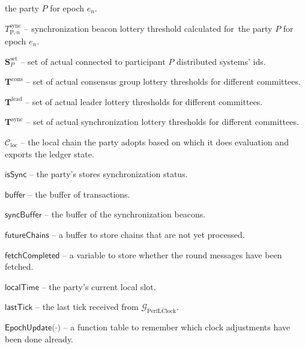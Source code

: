 \begin{legal}
    the party $P$ for epoch $e_n$.
    \item[\ding{113}] $T^{\text{sync}}_{\text{P}, n}$ -- synchronization beacon lottery threshold calculated for\
    the party $P$ for epoch $e_n$.
    \item[\ding{113}] $\mathbf{S}_P^{\text{set}}$ -- set of actual connected to participant $P$ distributed systems' ids.
    \item[\ding{113}] $\mathbf{T}^{\text{cons}}$ -- set of actual consensus group lottery thresholds for different committees.
    \item[\ding{113}] $\mathbf{T}^{\text{lead}}$ -- set of actual leader lottery thresholds for different committees.
    \item[\ding{113}] $\mathbf{T}^{\text{sync}}$ -- set of actual synchronization lottery thresholds for different committees.
    \item[\ding{113}] $\mathcal{C}_{\text{loc}}$ -- the local chain the party adopts based on which it does evaluation and
    exports the ledger state.
    \item[\ding{113}] $\textsf{isSync}$ -- the party's stores synchronization status.
    \item[\ding{113}] $\textsf{buffer}$ -- the buffer of transactions.
    \item[\ding{113}] $\textsf{syncBuffer}$ -- the buffer of the synchronization beacons.
    \item[\ding{113}] $\textsf{futureChains}$ -- a buﬀer to store chains that are not yet processed.
    \item[\ding{113}] $\textsf{fetchCompleted}$ -- a variable to store whether the round messages have been fetched.
    \item[\ding{113}] $\textsf{localTime}$ -- the party's current local slot.
    \item[\ding{113}] $\textsf{lastTick}$ -- the last tick received from $\mathcal{G}_{\text{PerfLClock}}$.
    \item[\ding{113}] $\textsf{EpochUpdate(·)}$ -- a function table to remember which clock adjustments have been done already.

\end{legal}
